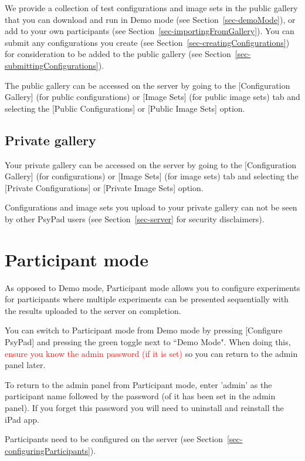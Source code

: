 \documentclass{article}
\begin{document}
We provide a collection of test configurations and image sets in the public gallery that you can download and run in
Demo mode (see Section~\ref{sec-demoMode}), or add to your own 
participants (see Section~\ref{sec-importingFromGallery}). You can submit any configurations you create (see Section~\ref{sec-creatingConfigurations}) for consideration to be added to the public gallery (see Section~\ref{sec-submittingConfigurations}).

The public gallery can be accessed on the server by going to the [Configuration Gallery] (for public configurations) or [Image Sets] (for public image sets) tab and selecting the [Public Configurations] or [Public Image Sets] option.

\subsection{Private gallery}
\label{sec-privateGallery}

Your private gallery can be accessed on the server by going to the [Configuration Gallery] (for configurations) or [Image Sets] (for image sets) tab and selecting the [Private Configurations] or [Private Image Sets] option.

Configurations and image sets you upload to your private gallery can not be seen by other PsyPad users (see Section~\ref{sec-server} for security disclaimers).


\section{Participant mode}
\label{sec-participantMode}

As opposed to Demo mode, Participant mode allows you to configure experiments for participants
where multiple experiments can be presented sequentially with the
results uploaded to the server on completion.

You can switch to Participant mode from Demo mode by pressing
[Configure PsyPad] and pressing the green toggle next to ``Demo Mode".
When doing this, \textcolor{red}{ensure you know the admin password (if it is set)} so you can return to
the admin panel later.

To return to the admin panel from Participant mode,
enter 'admin' as the participant name followed by the password (of it has been 
set in the admin panel).
If you forget this password you will need to uninstall and reinstall
the iPad app.

Participants need to be configured on the server (see Section~\ref{sec-configuringParticipants}).
\end{document}
